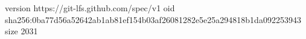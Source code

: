 version https://git-lfs.github.com/spec/v1
oid sha256:0ba77d56a52642ab1ab81ef154b03af26081282e5e25a294818b1da092253943
size 2031
